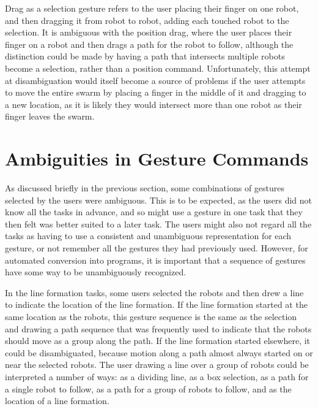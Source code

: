 Drag as a selection gesture refers to the user placing their finger on one robot, and then dragging it from robot to robot, adding each touched robot to the selection. 
It is ambiguous with the position drag, where the user places their finger on a robot and then drags a path for the robot to follow, although the distinction could be made by having a path that intersects multiple robots become a selection, rather than a position command. 
Unfortunately, this attempt at disambiguation would itself become a source of problems if the user attempts to move the entire swarm by placing a finger in the middle of it and dragging to a new location, as it is likely they would intersect more than one robot as their finger leaves the swarm.

\section{Ambiguities in Gesture Commands}

As discussed briefly in the previous section, some combinations of gestures selected by the users were ambiguous. 
This is to be expected, as the users did not know all the tasks in advance, and so might use a gesture in one task that they then felt was better suited to a later task.
The users might also not regard all the tasks as having to use a consistent and unambiguous representation for each gesture, or not remember all the gestures they had previously used. 
However, for automated conversion into programs, it is important that a sequence of gestures have some way to be unambiguously recognized. 

In the line formation tasks, some users selected the robots and then drew a line to indicate the location of the line formation. 
If the line formation started at the same location as the robots, this gesture sequence is the same as the selection and drawing a path sequence that was frequently used to indicate that the robots should move as a group along the path. 
If the line formation started elsewhere, it could be disambiguated, because motion along a path almost always started on or near the selected robots.  
The user drawing a line over a group of robots could be interpreted a number of ways: as a dividing line, as a box selection, as a path for a single robot to follow, as a path for a group of robots to follow, and as the location of a line formation.

